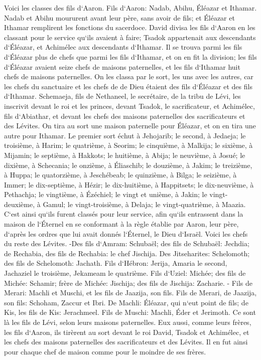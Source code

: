 \verse Voici les classes des fils d`Aaron. Fils d`Aaron: Nadab, Abihu, Éléazar et Ithamar. 
\verse Nadab et Abihu moururent avant leur père, sans avoir de fils; et Éléazar et Ithamar remplirent les fonctions du sacerdoce. 
\verse David divisa les fils d`Aaron en les classant pour le service qu`ils avaient à faire; Tsadok appartenait aux descendants d`Éléazar, et Achimélec aux descendants d`Ithamar. 
\verse Il se trouva parmi les fils d`Éléazar plus de chefs que parmi les fils d`Ithamar, et on en fit la division; les fils d`Éléazar avaient seize chefs de maisons paternelles, et les fils d`Ithamar huit chefs de maisons paternelles. 
\verse On les classa par le sort, les uns avec les autres, car les chefs du sanctuaire et les chefs de de Dieu étaient des fils d`Éléazar et des fils d`Ithamar. 
\verse Schemaeja, fils de Nethaneel, le secrétaire, de la tribu de Lévi, les inscrivit devant le roi et les princes, devant Tsadok, le sacrificateur, et Achimélec, fils d`Abiathar, et devant les chefs des maisons paternelles des sacrificateurs et des Lévites. On tira au sort une maison paternelle pour Éléazar, et on en tira une autre pour Ithamar. 
\verse Le premier sort échut à Jehojarib; le second, à Jedaeja; 
\verse le troisième, à Harim; le quatrième, à Seorim; 
\verse le cinquième, à Malkija; le sixième, à Mijamin; 
\verse le septième, à Hakkots; le huitième, à Abija; 
\verse le neuvième, à Josué; le dixième, à Schecania; 
\verse le onzième, à Éliaschib; le douzième, à Jakim; 
\verse le treizième, à Huppa; le quatorzième, à Jeschébeab; 
\verse le quinzième, à Bilga; le seizième, à Immer; 
\verse le dix-septième, à Hézir; le dix-huitième, à Happitsets; 
\verse le dix-neuvième, à Pethachja; le vingtième, à Ézéchiel; 
\verse le vingt et unième, à Jakin; le vingt-deuxième, à Gamul; 
\verse le vingt-troisième, à Delaja; le vingt-quatrième, à Maazia. 
\verse C`est ainsi qu`ils furent classés pour leur service, afin qu`ils entrassent dans la maison de l`Éternel en se conformant à la règle établie par Aaron, leur père, d`après les ordres que lui avait donnés l`Éternel, le Dieu d`Israël. 
\verse Voici les chefs du reste des Lévites. -Des fils d`Amram: Schubaël; des fils de Schubaël: Jechdia; 
\verse de Rechabia, des fils de Rechabia: le chef Jischija. 
\verse Des Jitseharites: Schelomoth; des fils de Schelomoth: Jachath. 
\verse Fils d`Hébron: Jerija, Amaria le second, Jachaziel le troisième, Jekameam le quatrième. 
\verse Fils d`Uziel: Michée; des fils de Michée: Schamir; 
\verse frère de Michée: Jischija; des fils de Jischija: Zacharie. - 
\verse Fils de Merari: Machli et Muschi, et les fils de Jaazija, son fils. 
\verse Fils de Merari, de Jaazija, son fils: Schoham, Zaccur et Ibri. 
\verse De Machli: Éléazar, qui n`eut point de fils; 
\verse de Kis, les fils de Kis: Jerachmeel. 
\verse Fils de Muschi: Machli, Éder et Jerimoth. Ce sont là les fils de Lévi, selon leurs maisons paternelles. 
\verse Eux aussi, comme leurs frères, les fils d`Aaron, ils tirèrent au sort devant le roi David, Tsadok et Achimélec, et les chefs des maisons paternelles des sacrificateurs et des Lévites. Il en fut ainsi pour chaque chef de maison comme pour le moindre de ses frères. 

